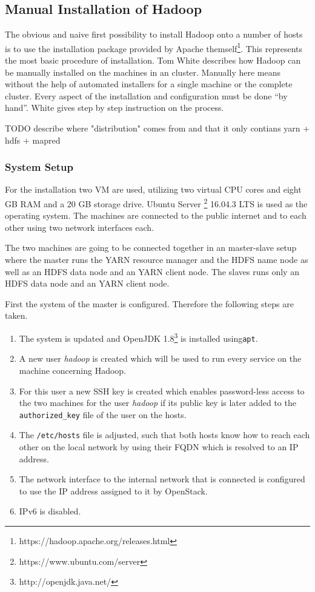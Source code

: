 \subsection{Manual Installation of Hadoop}

The obvious and naive first possibility to install Hadoop onto a number of hosts 
is to use the installation package provided by Apache themself\footnote{https://hadoop.apache.org/releases.html}.
This represents the most basic procedure of installation.
Tom White \autocite[][Appendix A]{white2015hadoop} describes how Hadoop can be manually installed on the machines in an cluster. 
Manually here means without the help of automated installers for a single machine or the complete cluster. 
Every aspect of the installation and configuration must be done \enquote{by hand}.
White gives step by step instruction on the process.

TODO describe where "distribution" comes from and that it only contians yarn + hdfs + mapred

\subsubsection{System Setup}
For the installation two \acs{VM} are used, utilizing two virtual \ac{CPU} cores and eight \ac{GB} \ac{RAM} and a 20 \ac{GB} storage drive. 
Ubuntu Server \footnote{https://www.ubuntu.com/server} 16.04.3 \ac{LTS} is used as the operating system. 
The machines are connected to the public internet and to each other using two network interfaces each.

The two machines are going to be connected together in an master-slave setup
where the master runs the \ac{YARN} resource manager and the \ac{HDFS} name node as well as an \ac{HDFS} data node and an \ac{YARN} client node.
The slaves runs only an \ac{HDFS} data node and an \ac{YARN} client node.

First the system of the master is configured. Therefore the following steps are taken.

\begin{enumerate}
    \item The system is updated and OpenJDK 1.8\footnote{http://openjdk.java.net/}  is installed using\texttt{apt}. 
    \item A new user \emph{hadoop} is created which will be used to run every service on the machine concerning Hadoop.
    \item For this user a new \ac{SSH} key is created which enables password-less access to the two machines for the user \emph{hadoop} if its public key is later added to the \texttt{authorized\_key} file of the user on the hosts.
    \item The \texttt{/etc/hosts} file is adjusted, such that both hosts know how to reach each other on the local network by using their \acs{FQDN} which is resolved to an \ac{IP} address.
    \item The network interface to the internal network that is connected is configured to use the \ac{IP} address assigned to it by OpenStack.
    \item \ac{IP}v6 is disabled.
\end{enumerate}

